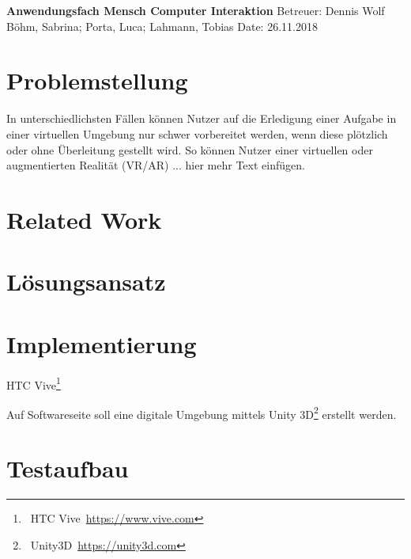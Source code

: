 \documentclass[a4paper, 11pt]{article}
\begin{document}
\noindent
\large\textbf{Anwendungsfach Mensch Computer Interaktion} \hfill Betreuer: Dennis Wolf \\
\normalsize Böhm, Sabrina; Porta, Luca; Lahmann, Tobias \hfill Date: 26.11.2018 \\


\section*{Problemstellung}
In unterschiedlichsten Fällen können Nutzer auf die Erledigung einer Aufgabe in einer virtuellen Umgebung nur schwer vorbereitet werden, wenn diese  plötzlich oder ohne Überleitung gestellt wird. So können Nutzer einer virtuellen oder augmentierten Realität (VR/AR) ... hier mehr Text einfügen.

\section*{Related Work}
\cite{yumiko2017VisAttention, seppelt2017attend, yeh2001cueReliability, bonanni2005attention, tonnis2005attention, green1995hazard}

\section*{Lösungsansatz}


\section*{Implementierung}
HTC Vive\footnote{~HTC Vive~\url{https://www.vive.com}}

Auf Softwareseite soll eine digitale Umgebung mittels Unity 3D\footnote{~Unity3D~\url{https://unity3d.com}} erstellt werden.

\section*{Testaufbau}
\end{document}
